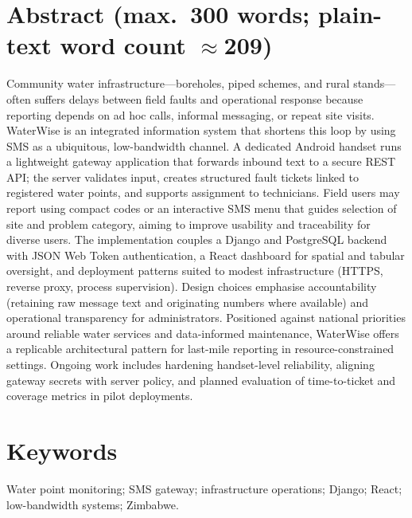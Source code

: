 \documentclass[11pt,a4paper]{article}
\begin{document}
\section*{Abstract (max.\ 300 words; plain-text word count $\approx$209)}

Community water infrastructure---boreholes, piped schemes, and rural stands---often suffers delays between field faults and operational response because reporting depends on ad hoc calls, informal messaging, or repeat site visits. WaterWise is an integrated information system that shortens this loop by using SMS as a ubiquitous, low-bandwidth channel. A dedicated Android handset runs a lightweight gateway application that forwards inbound text to a secure REST API; the server validates input, creates structured fault tickets linked to registered water points, and supports assignment to technicians. Field users may report using compact codes or an interactive SMS menu that guides selection of site and problem category, aiming to improve usability and traceability for diverse users. The implementation couples a Django and PostgreSQL backend with JSON Web Token authentication, a React dashboard for spatial and tabular oversight, and deployment patterns suited to modest infrastructure (HTTPS, reverse proxy, process supervision). Design choices emphasise accountability (retaining raw message text and originating numbers where available) and operational transparency for administrators. Positioned against national priorities around reliable water services and data-informed maintenance, WaterWise offers a replicable architectural pattern for last-mile reporting in resource-constrained settings. Ongoing work includes hardening handset-level reliability, aligning gateway secrets with server policy, and planned evaluation of time-to-ticket and coverage metrics in pilot deployments.

\section*{Keywords}
Water point monitoring; SMS gateway; infrastructure operations; Django; React; low-bandwidth systems; Zimbabwe.

\end{document}
